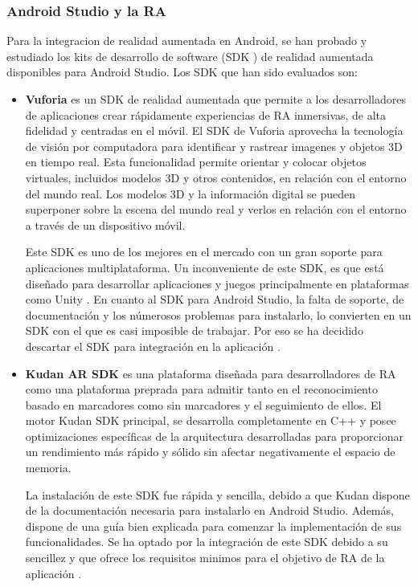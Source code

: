 \subsubsection{Android Studio y la RA}


Para la integracion de realidad aumentada en Android, se han probado y estudiado los kits de desarrollo de software (SDK \cite{URL::SDK}) de realidad aumentada disponibles para Android Studio. Los SDK que han sido evaluados son:



\begin{itemize}
    
    \item  \textbf{Vuforia} \cite{URL::vuforia} es un SDK de realidad aumentada que permite a los desarrolladores de aplicaciones crear rápidamente experiencias de RA inmersivas, de alta fidelidad y centradas en el móvil. El SDK de Vuforia aprovecha la tecnología de visión por computadora para identificar y rastrear imagenes y objetos 3D en tiempo real. Esta funcionalidad permite orientar y colocar objetos virtuales, incluidos modelos 3D y otros contenidos, en relación con el entorno del mundo real. Los modelos 3D y la información digital se pueden superponer sobre la escena del mundo real y verlos en relación con el entorno a través de un dispositivo móvil.
    
    Este SDK es uno de los mejores en el mercado con un gran soporte para aplicaciones multiplataforma. Un inconveniente de este SDK, es que está diseñado para desarrollar aplicaciones y juegos principalmente en plataformas como Unity \cite{URL::Unity}. En cuanto al SDK para Android Studio, la falta de soporte, de documentación y los númerosos problemas para instalarlo, lo convierten en un SDK con el que es casi imposible de trabajar. Por eso se ha decidido descartar el SDK para integración en la aplicación \ULLAR{}.

    \item \textbf{Kudan AR SDK} \cite{URL::kudan} es una plataforma diseñada para desarrolladores de RA como una plataforma preprada para admitir tanto en el reconocimiento basado en marcadores como sin marcadores y el seguimiento de ellos. El motor Kudan SDK principal, se desarrolla completamente en C++ y posee optimizaciones específicas de la arquitectura desarrolladas para proporcionar un rendimiento más rápido y sólido sin afectar negativamente el espacio de memoria. 
    
    La instalación de este SDK fue rápida y sencilla, debido a que Kudan dispone de la documentación necesaria para instalarlo en Android Studio. Además, dispone de una guía bien explicada para comenzar la implementación de sus funcionalidades. Se ha optado por la integración de este SDK debido a su sencillez y que ofrece los requisitos minimos para el objetivo de RA de la aplicación \ULLAR{}.


\end{itemize}
